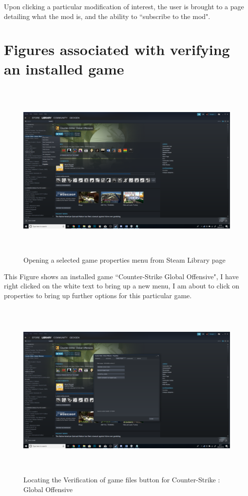 Upon clicking a particular modification of interest, the user is brought to a page detailing what the mod is, and the ability to ``subscribe to the mod". 

\section{Figures associated with verifying an installed game}

\begin{figure}[H]
\includegraphics[width=16cm,height=9cm]{Screenshots/SteamScreenShots/verifyCSProperties.png}
\caption{Opening a selected game properties menu from Steam Library page}    
\end{figure} 

This Figure shows an installed game ``Counter-Strike Global Offensive", I have right clicked on the white text to bring up a new menu, I am about to click on properties to bring up further options for this particular game.

\begin{figure}[H]
\includegraphics[width=16cm,height=9cm]{Screenshots/SteamScreenShots/verifyCSButtonLocation.png}
\caption{Locating the Verification of game files button for Counter-Strike : Global Offensive}    
\end{figure} 

